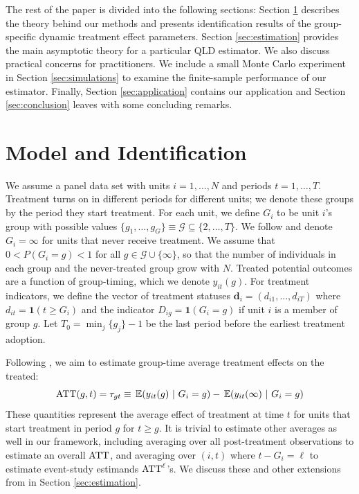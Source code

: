 \documentclass[12pt]{article}
\begin{document}
The rest of the paper is divided into the following sections: Section \ref{sec:theory} describes the theory behind our methods and presents identification results of the group-specific dynamic treatment effect parameters. Section \ref{sec:estimation} provides the main asymptotic theory for a particular QLD estimator. We also discuss practical concerns for practitioners. We include a small Monte Carlo experiment in Section \ref{sec:simulations} to examine the finite-sample performance of our estimator. Finally, Section \ref{sec:application} contains our application and Section \ref{sec:conclusion} leaves with some concluding remarks. 


\section{Model and Identification} \label{sec:theory}

We assume a panel data set with units $i = 1,\dots, N$ and periods $t = 1, \dots, T$. Treatment turns on in different periods for different units; we denote these groups by the period they start treatment. For each unit, we define $G_i$ to be unit $i$'s group with possible values $\{ g_1, \dots, g_G \} \equiv \mathcal{G} \subseteq \{ 2, \dots, T \}$. We follow \citet{Callaway_Santanna_2021} and denote $G_i = \infty$ for units that never receive treatment. We assume that $0 < P(G_i = g) < 1$ for all $g \in \mathcal{G} \cup \{ \infty \}$, so that the number of individuals in each group and the never-treated group grow with $N$. Treated potential outcomes are a function of group-timing, which we denote $y_{it}(g)$. For treatment indicators, we define the vector of treatment statuses $\bm d_{i} = (d_{i1},...,d_{iT})$ where $d_{it} = \mathbf{1}(t \geq G_i)$ and the indicator $D_{ig} = \mathbf{1}(G_i = g)$ if unit $i$ is a member of group $g$. Let $T_0 = \min_j \{ g_j \} - 1$ be the last period before the earliest treatment adoption. 


Following \citet{Callaway_Santanna_2021}, we aim to estimate group-time average treatment effects on the treated:
\begin{equation}
  \ATT(g,t) = \tau_{gt} \equiv \expec{y_{it}(g)}{G_i = g} - \expec{y_{it}(\infty)}{G_i = g}
\end{equation}
These quantities represent the average effect of treatment at time $t$ for units that start treatment in period $g$ for $t \geq g$. It is trivial to estimate other averages as well in our framework, including averaging over all post-treatment observations to estimate an overall $\text{ATT}$, and averaging over $(i,t)$ where $t - G_i = \ell$ to estimate event-study estimands $\text{ATT}^\ell$'s. We discuss these and other extensions from \citet{Callaway_Santanna_2021} in Section \ref{sec:estimation}.
\end{document}

